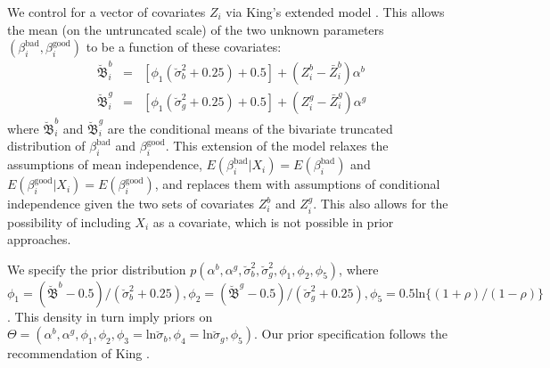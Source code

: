 \documentclass[11pt,titlepage]{article}
\newcommand{\bbetau}{\breve{\mathfrak B}}
\newcommand{\sigmau}{\breve{\sigma}}
\newcommand{\bb}{\beta^{\text{bad}}}
\newcommand{\bg}{\beta^{\text{good}}}
\begin{document}
We control for a vector of covariates $Z_i$ via King's extended model
\cite[Ch.\ 9]{king:97}.  This allows the mean (on the untruncated
scale) of the two unknown parameters $(\bb_i, \bg_i)$ to be a function
of these covariates:
\begin{eqnarray}
\bbetau_i^b & = & [\phi_1 (\sigmau^2_b + 0.25) + 0.5] + (Z_i^b -
\bar{Z}_i^b) \alpha^b \\
\bbetau_i^g & = & [\phi_1 (\sigmau^2_g + 0.25) + 0.5] + (Z_i^g -
\bar{Z}_i^g) \alpha^g
\end{eqnarray}
where $\bbetau_i^b$ and $\bbetau_i^g$ are the conditional means of the
bivariate truncated distribution of $\bb_i$ and $\bg_i$.  This
extension of the model relaxes the assumptions of mean independence,
$E(\bb_i|X_i)=E(\bb_i)$ and $E(\bg_i|X_i)=E(\bg_i)$, and replaces them
with assumptions of conditional independence given the two sets of
covariates $Z_i^b$ and $Z_i^g$.  This also allows for the possibility
of including $X_i$ as a covariate, which is not possible in prior
approaches. 

We specify the prior distribution $p(\alpha^b, \alpha^g, \sigmau^2_b,
\sigmau^2_g, \phi_1, \phi_2, \phi_5)$, where
$\phi_1=(\bbetau^b-0.5)/(\sigmau_b^2+0.25),
\phi_2=(\bbetau^g-0.5)/(\sigmau_g^2+0.25), \phi_5=0.5
\text{ln}\{(1+\rho)/(1-\rho)\}$. This density in turn imply priors on
$\Theta=(\alpha^b, \alpha^g, \phi_1, \phi_2,
\phi_3=\text{ln}\sigmau_b, \phi_4=\text{ln}\sigmau_g, \phi_5)$.  Our
prior specification follows the recommendation of King
\citeyear[chapter7]{king:97}.

\singlespacing

% 

\end{document}
